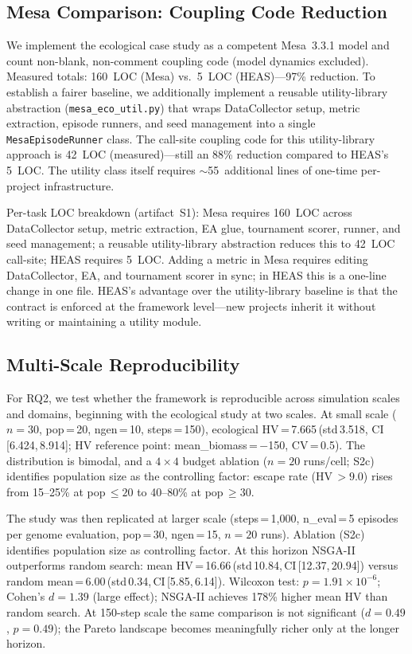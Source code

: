 \documentclass{wscpaperproc}
\begin{document}
\subsection{Mesa Comparison: Coupling Code Reduction}
\label{sec:mesa-comparison}

We implement the ecological case study as a competent Mesa~3.3.1 model and
count non-blank, non-comment coupling code (model dynamics excluded).
Measured totals: 160~LOC (Mesa) vs.\ 5~LOC (HEAS)---97\% reduction.
To establish a fairer baseline, we additionally implement a reusable
utility-library abstraction (\texttt{mesa\_eco\_util.py}) that wraps
DataCollector setup, metric extraction, episode runners, and seed management
into a single \texttt{MesaEpisodeRunner} class. The call-site coupling code
for this utility-library approach is 42~LOC (measured)---still an 88\%
reduction compared to HEAS's 5~LOC. The utility class itself requires
$\sim$55~additional lines of one-time per-project infrastructure.

Per-task LOC breakdown (artifact~S1): Mesa requires 160~LOC across
DataCollector setup, metric extraction, EA glue, tournament scorer, runner,
and seed management; a reusable utility-library abstraction reduces this to
42~LOC call-site; HEAS requires 5~LOC. Adding a metric in Mesa requires
editing DataCollector, EA, and tournament scorer in sync; in HEAS this is a
one-line change in one file. HEAS's advantage over the utility-library baseline
is that the contract is enforced at the framework level---new projects inherit
it without writing or maintaining a utility module.

\subsection{Multi-Scale Reproducibility}
\label{sec:multiscale}

For RQ2, we test whether the framework is reproducible across simulation
scales and domains, beginning with the ecological study at two scales. At small scale
($n\!=\!30$, pop\,=\,20, ngen\,=\,10, steps\,=\,150),
ecological HV\,=\,7.665\,(std\,3.518, CI\,[6.424,\,8.914]; HV reference point:
mean\_biomass\,=\,$-$150, CV\,=\,0.5).
The distribution is bimodal, and a $4\!\times\!4$ budget ablation
($n\!=\!20$ runs/cell; S2c) identifies population size as the controlling
factor: escape rate (HV\,$>\!9.0$) rises from 15--25\% at pop\,$\le\!20$ to
40--80\% at pop\,$\ge\!30$.

The study was then replicated at larger scale
(steps\,=\,1,000, n\_eval\,=\,5 episodes per genome evaluation, pop\,=\,30,
ngen\,=\,15, $n\!=\!20$ runs). Ablation (S2c) identifies population size as
controlling factor. At this horizon NSGA-II outperforms random search: mean HV\,=\,16.66\,(std\,10.84,\,CI\,[12.37,\,20.94])
versus random mean\,=\,6.00\,(std\,0.34,\,CI\,[5.85,\,6.14]).
Wilcoxon test: $p\!=\!1.91\!\times\!10^{-6}$; Cohen's $d\!=\!1.39$
(large effect); NSGA-II achieves 178\% higher mean HV than random search.
At 150-step scale the same comparison is not significant ($d\!=\!0.49$,
$p\!=\!0.49$); the Pareto landscape becomes meaningfully richer only at the
longer horizon.
\end{document}
